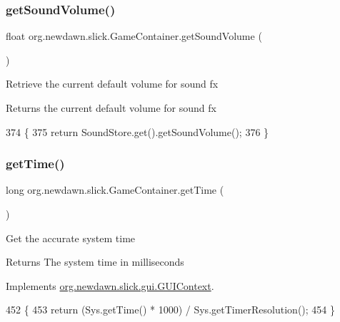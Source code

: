 \subsubsection{\texorpdfstring{get\+Sound\+Volume()}{getSoundVolume()}}
{\footnotesize\ttfamily float org.\+newdawn.\+slick.\+Game\+Container.\+get\+Sound\+Volume (\begin{DoxyParamCaption}{ }\end{DoxyParamCaption})\hspace{0.3cm}{\ttfamily [inline]}}

Retrieve the current default volume for sound fx \begin{DoxyReturn}{Returns}
the current default volume for sound fx 
\end{DoxyReturn}

\begin{DoxyCode}
374                                   \{
375         \textcolor{keywordflow}{return} SoundStore.get().getSoundVolume();
376     \}
\end{DoxyCode}
\mbox{\label{classorg_1_1newdawn_1_1slick_1_1_game_container_a1650b161216693ec0b4c0d9d00496c05}} 
\subsubsection{\texorpdfstring{get\+Time()}{getTime()}}
{\footnotesize\ttfamily long org.\+newdawn.\+slick.\+Game\+Container.\+get\+Time (\begin{DoxyParamCaption}{ }\end{DoxyParamCaption})\hspace{0.3cm}{\ttfamily [inline]}}

Get the accurate system time

\begin{DoxyReturn}{Returns}
The system time in milliseconds 
\end{DoxyReturn}


Implements \mbox{\hyperlink{interfaceorg_1_1newdawn_1_1slick_1_1gui_1_1_g_u_i_context_a796c54a6f7d2337903afd68002dfeb0d}{org.\+newdawn.\+slick.\+gui.\+G\+U\+I\+Context}}.


\begin{DoxyCode}
452                           \{
453         \textcolor{keywordflow}{return} (Sys.getTime() * 1000) / Sys.getTimerResolution();
454     \}
\end{DoxyCode}
\mbox{\label{classorg_1_1newdawn_1_1slick_1_1_game_container_a938fe1a28567182445e60450915d5f69}} 
